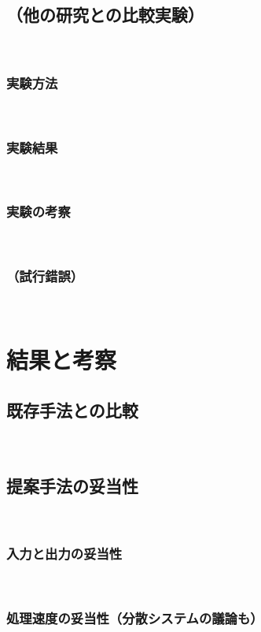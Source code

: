 \documentclass[12pt,a4j]{jreport}
\begin{document}
\section{（他の研究との比較実験）}
~

\subsection{実験方法}
~

\subsection{実験結果}
~

\subsection{実験の考察}
~

\subsection{（試行錯誤）}
~


\chapter{結果と考察}


\section{既存手法との比較}
~

\section{提案手法の妥当性}
~

\subsection{入力と出力の妥当性}
~

\subsection{処理速度の妥当性（分散システムの議論も）}
~
\end{document}
